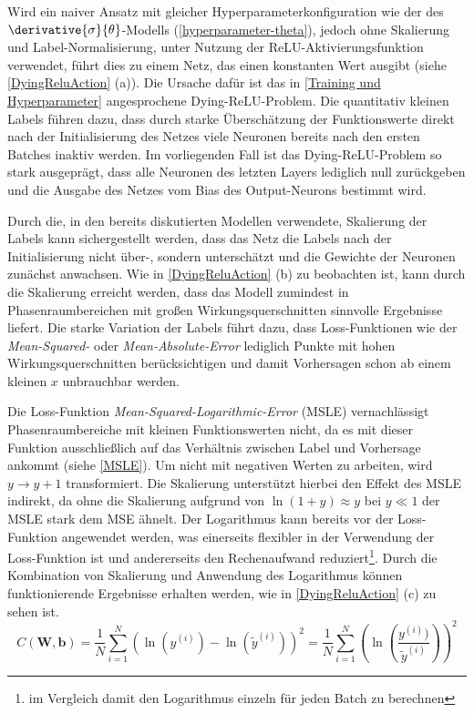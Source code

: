 Wird ein naiver Ansatz mit gleicher Hyperparameterkonfiguration wie der des $\derivative{\sigma}{\theta}$-Modells (\textsf{\autoref{hyperparameter-theta}}), jedoch ohne Skalierung und Label-Normalisierung, unter Nutzung der ReLU-Aktivierungsfunktion verwendet, führt dies zu einem Netz, das einen konstanten Wert ausgibt (siehe \textsf{\autoref{DyingReluAction}} (a)). Die Ursache dafür ist das in \textsf{\autoref{Training und Hyperparameter}} angesprochene Dying-ReLU-Problem.  Die quantitativ kleinen Labels führen dazu, dass durch starke Überschätzung der Funktionswerte direkt nach der Initialisierung des Netzes viele Neuronen bereits nach den ersten Batches inaktiv werden. Im vorliegenden Fall ist das Dying-ReLU-Problem so stark ausgeprägt, dass alle Neuronen des letzten Layers lediglich null zurückgeben und die Ausgabe des Netzes vom Bias des Output-Neurons bestimmt wird. 

Durch die, in den bereits diskutierten Modellen verwendete, Skalierung der Labels kann sichergestellt werden, dass das Netz die Labels nach der Initialisierung nicht über-, sondern unterschätzt und die Gewichte der Neuronen zunächst anwachsen. Wie in \textsf{\autoref{DyingReluAction} (b)} zu beobachten ist, kann durch die Skalierung erreicht werden, dass das Modell zumindest in Phasenraumbereichen mit großen Wirkungsquerschnitten sinnvolle Ergebnisse liefert. Die starke Variation der Labels führt dazu, dass Loss-Funktionen wie der \textit{Mean-Squared-} oder \textit{Mean-Absolute-Error} lediglich Punkte mit hohen Wirkungsquerschnitten berücksichtigen und damit Vorhersagen schon ab einem kleinen $x$ unbrauchbar werden.

Die Loss-Funktion \textit{Mean-Squared-Logarithmic-Error} (MSLE) vernachlässigt Phasenraumbereiche mit kleinen Funktionswerten nicht, da es mit dieser Funktion ausschließlich auf das Verhältnis zwischen Label und Vorhersage ankommt (siehe \textsf{\autoref{MSLE}}). Um nicht mit negativen Werten zu arbeiten, wird $y \rightarrow y + 1$ transformiert. Die Skalierung unterstützt hierbei den Effekt des MSLE indirekt, da ohne die Skalierung aufgrund von $\ln(1+y) \approx y$ bei $y \ll 1$ der MSLE stark dem MSE ähnelt. Der Logarithmus kann bereits vor der Loss-Funktion angewendet werden, was einerseits flexibler in der Verwendung der Loss-Funktion ist und andererseits den Rechenaufwand reduziert\footnote{im Vergleich damit den Logarithmus einzeln für jeden Batch zu berechnen}. Durch die Kombination von Skalierung und Anwendung des Logarithmus können funktionierende Ergebnisse erhalten werden, wie in \textsf{\autoref{DyingReluAction} (c)} zu sehen ist.
\begin{equation}
C\left(\mathbf{W}, \mathbf{b}\right) = \frac{1}{N} \sum_{i=1}^{N} \left(\ln(y^{(i)}) - \ln(\tilde{y}^{(i)})\right)^2 = \frac{1}{N} \sum_{i=1}^{N} \left(\ln(\frac{y^{(i)})}{\tilde{y}^{(i)}})\right)^2
\label{MSLE}
\end{equation}

